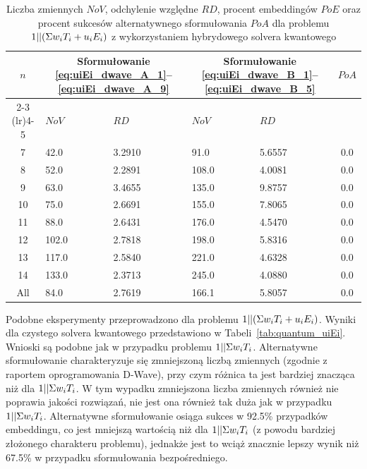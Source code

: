 \begin{table}[!ht]
\renewcommand{\arraystretch}{1.5}
\caption{Liczba zmiennych $\mathit{NoV}$, odchylenie względne $\mathit{RD}$, procent embeddingów $\mathit{PoE}$ oraz procent sukcesów alternatywnego sformułowania $\mathit{PoA}$ dla problemu $1||(\Sigma{}w_i T_i+u_i E_i)$ z wykorzystaniem hybrydowego solvera kwantowego }\label{tab:hybrid_uiEi}
\begin{tabularx}{\columnwidth}{c*{4}{X}c}
\toprule
\multirow{2}{*}{$n$} & \multicolumn{2}{c}{\scriptsize Sformułowanie \eqref{eq:uiEi_dwave_A_1}--\eqref{eq:uiEi_dwave_A_9}} & \multicolumn{2}{c}{\scriptsize Sformułowanie \eqref{eq:uiEi_dwave_B_1}--\eqref{eq:uiEi_dwave_B_5}} & \multirow{2}{*}{$\mathit{PoA}$} \\ \cmidrule(r){2-3} \cmidrule(lr){4-5}
& $\mathit{NoV}$ & $\mathit{RD}$  & $\mathit{NoV}$ & $\mathit{RD}$ & \\ \midrule
\phantom{0}7 & \phantom{0}42.0 & 3.2910 & \phantom{0}91.0 & 5.6557 & 0.0 \\
\phantom{0}8 & \phantom{0}52.0 & 2.2891 & 108.0 & 4.0081 & 0.0 \\
\phantom{0}9 & \phantom{0}63.0 & 3.4655 & 135.0 & 9.8757 & 0.0 \\
10 & \phantom{0}75.0 & 2.6691 & 155.0 & 7.8065 & 0.0 \\
11 & \phantom{0}88.0 & 2.6431 & 176.0 & 4.5470 & 0.0 \\
12 & 102.0 & 2.7818 & 198.0 & 5.8316 & 0.0 \\
13 & 117.0 & 2.5840 & 221.0 & 4.6328 & 0.0 \\
14 & 133.0 & 2.3713 & 245.0 & 4.0880 & 0.0 \\ \midrule
All & \phantom{0}84.0 & 2.7619 & 166.1 & 5.8057 & 0.0 \\
\bottomrule
\end{tabularx}
\renewcommand{\arraystretch}{1.0}
\end{table}

Podobne eksperymenty przeprowadzono dla problemu $1||(\Sigma{}w_i T_i+u_i E_i)$. Wyniki dla czystego solvera kwantowego przedstawiono w Tabeli~\ref{tab:quantum_uiEi}. Wnioski są podobne jak w przypadku problemu $1||\Sigma{}w_i T_i$. Alternatywne sformułowanie charakteryzuje się zmniejszoną liczbą zmiennych (zgodnie z raportem oprogramowania D-Wave), przy czym różnica ta jest bardziej znacząca niż dla $1||\Sigma{}w_i T_i$. W tym wypadku zmniejszona liczba zmiennych również nie poprawia jakości rozwiązań, nie jest ona również tak duża jak w przypadku $1||\Sigma{}w_i T_i$. Alternatywne sformułowanie osiąga sukces w 92.5\% przypadków embeddingu, co jest mniejszą wartością niż dla $1||\Sigma{}w_i T_i$ (z powodu bardziej złożonego charakteru problemu), jednakże jest to wciąż znacznie lepszy wynik niż 67.5\% w przypadku sformułowania bezpośredniego.

